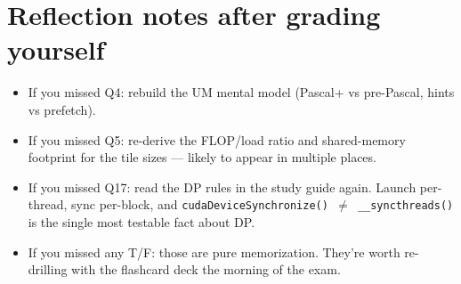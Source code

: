 \documentclass[11pt]{article}
\begin{document}
\hrulefill

\section*{Reflection notes after grading yourself}
\begin{itemize}
  \item If you missed Q4: rebuild the UM mental model (Pascal+ vs pre-Pascal, hints vs prefetch).
  \item If you missed Q5: re-derive the FLOP/load ratio and shared-memory footprint for the
        tile sizes — likely to appear in multiple places.
  \item If you missed Q17: read the DP rules in the study guide again. Launch per-thread,
        sync per-block, and \texttt{cudaDeviceSynchronize() $\neq$ \_\_syncthreads()} is the
        single most testable fact about DP.
  \item If you missed any T/F: those are pure memorization. They're worth re-drilling with the
        flashcard deck the morning of the exam.
\end{itemize}
\end{document}
